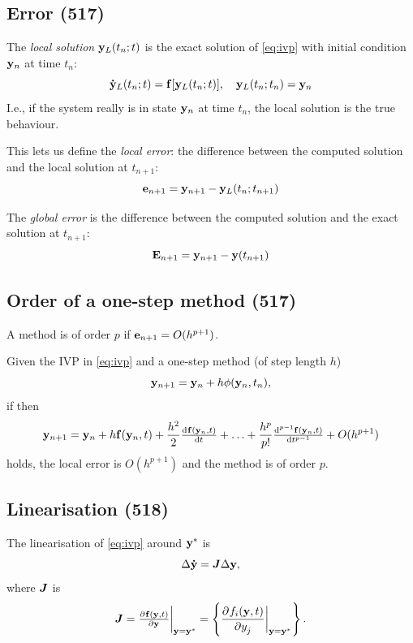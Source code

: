 \documentclass[a4paper, 12pt]{article}
\begin{document}
\subsection{Error (517)}
The \emph{local solution} \( \mathbf{y}_L(t_n; t) \) is the exact solution of \eqref{eq:ivp} with initial condition \( \mathbf{y}_n \) at time \( t_n \):
\begin{equation}
	\mathbf{\dot{y}}_L(t_n; t) = \mathbf{f}[\mathbf{y}_L(t_n; t)], \quad \mathbf{y}_L(t_n; t_n) = \mathbf{y}_n
\end{equation}
I.e., if the system really is in state \( \mathbf{y}_n \) at time \( t_n \), the local solution is the true behaviour.

This lets us define the \emph{local error}: the difference between the computed solution and the local solution at \( t_{n+1} \):
\begin{equation}
	\mathbf{e}_{n+1} = \mathbf{y}_{n+1} - \mathbf{y}_L(t_n; t_{n+1})
\end{equation}

The \emph{global error} is the difference between the computed solution and the exact solution at \( t_{n+1} \):
\begin{equation}
	\mathbf{E}_{n+1} = \mathbf{y}_{n+1} - \mathbf{y}(t_{n+1})
\end{equation}

\subsection{Order of a one-step method (517)}
A method is of order \( p \) if \( \mathbf{e}_{n+1} = O(h^{p+1}) \).

Given the IVP in \eqref{eq:ivp} and a one-step method (of step length \( h \))
\begin{equation}\label{eq:onestep}
	\mathbf{y}_{n+1} = \mathbf{y}_n + h \phi(\mathbf{y}_n, t_n),
\end{equation}
if then
\begin{equation}
	\y_{n+1} = \y_n + h \V{f}(\y_n, t) + \frac{h^2}{2} \od{\V{f}(\y_n, t)}{t} + \hdots + \frac{h^p}{p!} \od[p-1]{\V{f}(\y_n, t)}{t} + O(h^{p+1})
\end{equation}
holds, the local error is \( O(h^{p+1}) \) and the method is of order \( p \).

\subsection{Linearisation (518)}
The linearisation of \eqref{eq:ivp} around \( \mathbf{y}^* \) is
\begin{equation}
	\Delta \mathbf{\dot{y}} = \bm{J} \Delta \mathbf{y},
\end{equation}
where \( \bm{J} \) is
\begin{equation}
	\M{J}
	= \pd{\V{f}(\y,t)}{\y} \biggr\rvert_{\y = \y^*}
	= \left\{ \dpd{f_i(\y,t)}{y_j} \biggr\rvert_{\y = \y^*} \right\}.
\end{equation}
\end{document}
